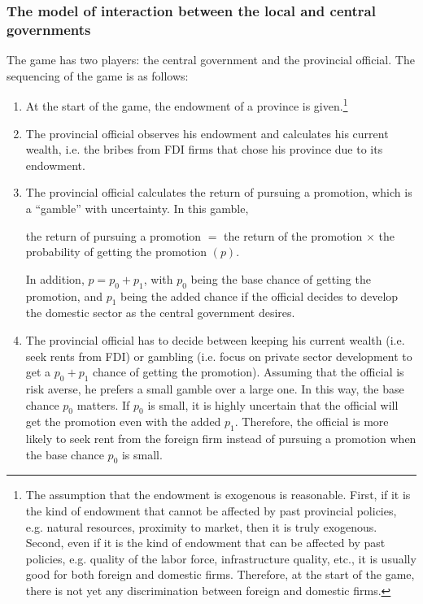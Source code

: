 \citep{Blomstrom2002}

\subsubsection{The model of interaction between the local and central governments}

The game has two players: the central government and the provincial official. The sequencing of the game is as follows:
\begin{enumerate}
\item At the start of the game, the endowment of a province is given.\footnote{The assumption that the endowment is exogenous is reasonable. First, if it is the kind of endowment that cannot be affected by past provincial policies, e.g. natural resources, proximity to market, then it is truly exogenous. Second, even if it is the kind of endowment that can be affected by past policies, e.g. quality of the labor force, infrastructure quality, etc., it is usually good for both foreign and domestic firms. Therefore, at the start of the game, there is not yet any discrimination between foreign and domestic firms.}
\item The provincial official observes his endowment and calculates his current wealth, i.e. the bribes from FDI firms that chose his province due to its endowment.
\item The provincial official calculates the return of pursuing a promotion, which is a ``gamble'' with uncertainty. In this gamble,

the return of pursuing a promotion $=$ the return of the promotion $\times$ the probability of getting the promotion $(p)$.

In addition, $p = p_0 + p_1$, with $p_0$ being the base chance of getting the promotion, and $p_1$ being the added chance if the official decides to develop the domestic sector as the central government desires.

\item The provincial official has to decide between keeping his current wealth (i.e. seek rents from FDI) or gambling (i.e. focus on private sector development to get a $p_0 + p_1$ chance of getting the promotion). Assuming that the official is risk averse, he prefers a small gamble over a large one. In this way, the base chance $p_0$ matters. If $p_0$ is small, it is highly uncertain that the official will get the promotion even with the added $p_1$. Therefore, the official is more likely to seek rent from the foreign firm instead of pursuing a promotion when the base chance $p_0$ is small. 
\end{enumerate}

